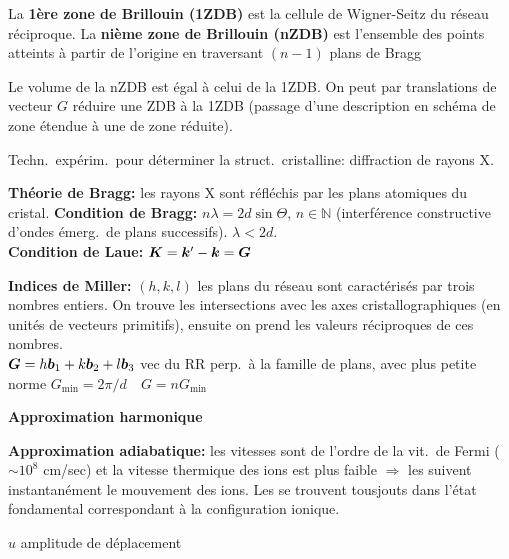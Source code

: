 \begin{squishlist}
    \item La \textbf{1ère zone de Brillouin (1ZDB)} est la cellule de Wigner-Seitz du réseau réciproque. La \textbf{nième zone de Brillouin (nZDB)} est l'ensemble des points atteints à partir de l'origine en traversant $(n-1)$ plans de Bragg
    \item Le volume de la nZDB est égal à celui de la 1ZDB. On peut par translations de vecteur $G$ réduire une ZDB à la 1ZDB (passage d'une description en schéma de zone étendue à une de zone réduite).
\end{squishlist}

Techn.\ expérim.\ pour déterminer la struct.\ cristalline: diffraction de rayons X.
\begin{squishlist}
    \item \textbf{Théorie de Bragg:} les rayons X sont réfléchis par les plans atomiques du cristal. \textbf{Condition de Bragg:} $n \lambda = 2d \sin \Theta$, $n \in \mathbb{N}$ (interférence constructive d'ondes émerg.\ de plans successifs). $\lambda < 2d$. \\
    \textbf{Condition de Laue:} $\bm{K} = \bm{k}'-\bm{k} = \bm{G}$

    \item \textbf{Indices de Miller:} $(h,k,l)$ les plans du réseau sont caractérisés par trois nombres entiers. On trouve les intersections avec les axes cristallographiques (en unités de vecteurs primitifs), ensuite on prend les valeurs réciproques de ces nombres.\\
    $\bm{G} = h \bm{b}_1 + k \bm{b}_2 + l \bm{b}_3$ vec du RR perp.\ à la famille de plans, avec plus petite norme $G_{\min} = 2\pi / d \quad G = n G_{\min}$
\end{squishlist}

\begin{squishlist}
    \item \textbf{Approximation harmonique}
    \item \textbf{Approximation adiabatique:} les vitesses \elec sont de l'ordre de la vit.\ de Fermi ($\sim 10^8$ cm/sec) et la vitesse thermique des ions est plus faible $\Rightarrow$ les \elec suivent instantanément le mouvement des ions. Les \elec se trouvent tousjouts dans l'état fondamental correspondant à la configuration ionique.
    \item $u$ amplitude de déplacement
\end{squishlist}

